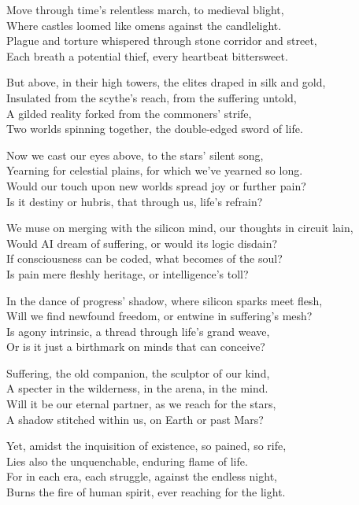 \documentclass[10pt,letterpaper]{article}
\begin{document}
\begin{center}
\bigskip

Move through time’s relentless march, to medieval blight,\\
Where castles loomed like omens against the candlelight.\\
Plague and torture whispered through stone corridor and street,\\
Each breath a potential thief, every heartbeat bittersweet.\\

\bigskip

But above, in their high towers, the elites draped in silk and gold,\\
Insulated from the scythe’s reach, from the suffering untold,\\
A gilded reality forked from the commoners' strife,\\
Two worlds spinning together, the double-edged sword of life.\\

\bigskip

Now we cast our eyes above, to the stars' silent song,\\
Yearning for celestial plains, for which we've yearned so long.\\
Would our touch upon new worlds spread joy or further pain?\\
Is it destiny or hubris, that through us, life's refrain?\\

\bigskip

We muse on merging with the silicon mind, our thoughts in circuit lain,\\
Would AI dream of suffering, or would its logic disdain?\\
If consciousness can be coded, what becomes of the soul?\\
Is pain mere fleshly heritage, or intelligence's toll?\\

\bigskip

In the dance of progress' shadow, where silicon sparks meet flesh,\\
Will we find newfound freedom, or entwine in suffering's mesh?\\
Is agony intrinsic, a thread through life's grand weave,\\
Or is it just a birthmark on minds that can conceive?\\

\bigskip

Suffering, the old companion, the sculptor of our kind,\\
A specter in the wilderness, in the arena, in the mind.\\
Will it be our eternal partner, as we reach for the stars,\\
A shadow stitched within us, on Earth or past Mars?\\

\bigskip

Yet, amidst the inquisition of existence, so pained, so rife,\\
Lies also the unquenchable, enduring flame of life.\\
For in each era, each struggle, against the endless night,\\
Burns the fire of human spirit, ever reaching for the light.\\

\end{center}
\end{document}
